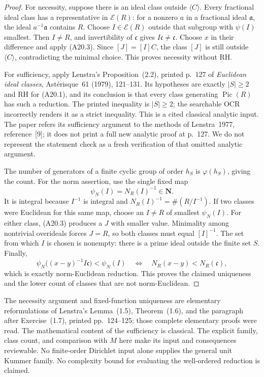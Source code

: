 \begin{proof}
For necessity, suppose there is an ideal class outside
$\langle C\rangle$. Every fractional ideal class has a
representative in $\mathcal E(R)$: for a nonzero
$a$ in a fractional ideal $\mathfrak a$, the ideal
$a^{-1}\mathfrak a$ contains $R$.
Choose $I\in\mathcal E(R)$ outside that subgroup with
$\psi(I)$ smallest. Then $I\ne R$, and invertibility
of $\mathfrak c$ gives $I\mathfrak c\ne\mathfrak c$.
Choose $x$ in their difference and apply (A20.3).
Since $[J]=[I]C$, the class $[J]$ is still outside
$\langle C\rangle$, contradicting the minimal choice.
This proves necessity without RH.

For sufficiency, apply Lenstra's Proposition~(2.2),
printed p.~127 of \emph{Euclidean ideal classes},
Ast\'erisque~61 (1979), 121--131. Its hypotheses are
exactly $|S|\ge2$ and RH for (A20.1), and its conclusion
is that every class generating $\operatorname{Pic}(R)$
has such a reduction. The printed inequality is
$|S|\ge2$; the searchable OCR incorrectly renders it
as a strict inequality. This is a cited classical
analytic input. The paper refers its sufficiency
argument to the methods of Lenstra~1977, reference~[9];
it does not print a full new analytic proof at p.~127.
We do not represent the statement check as a fresh
verification of that omitted analytic argument.

The number of generators of a finite cyclic group of
order $h_S$ is $\varphi(h_S)$, giving the count.
For the norm assertion, use the single fixed map
\[
                       \psi_N(I)=N_R(I)^{-1}\in\mathbf N.
 \tag{A20.4}
\]
It is integral because $I^{-1}$ is integral and
$N_R(I)^{-1}=\#(R/I^{-1})$.
If two classes were Euclidean for this same map,
choose an $I\ne R$ of smallest $\psi_N(I)$.
For either class, (A20.3) produces a $J$ with smaller
value. Minimality among nontrivial overideals forces
$J=R$, so both classes must equal $[I]^{-1}$.
The set from which $I$ is chosen is nonempty:
there is a prime ideal outside the finite set $S$.
Finally,
\[
 \psi_N\bigl((x-y)^{-1}I\mathfrak c\bigr)<\psi_N(I)
                  \quad\Longleftrightarrow\quad
                     N_R(x-y)<N_R(\mathfrak c),
\]
which is exactly norm-Euclidean reduction. This proves
the claimed uniqueness and the lower count of classes
that are not norm-Euclidean.
\end{proof}

The necessity argument and fixed-function uniqueness
are elementary reformulations of Lenstra's
Lemma~(1.5), Theorem~(1.6), and the paragraph after
Exercise~(1.7), printed pp.~124--125; those complete
elementary proofs were read. The mathematical content
of the sufficiency is classical. The explicit family,
class count, and comparison with $M$ here make its
input and consequences reviewable. No finite-order
Dirichlet input alone supplies the general unit
Kummer family. No complexity bound for evaluating
the well-ordered reduction is claimed.

